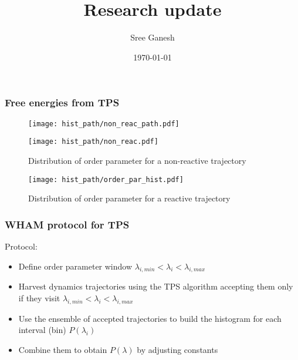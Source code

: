 \documentclass[a4paper,8pt]{beamer}
\title[Free energy]{Research update}
\date{\today}
\author{Sree Ganesh}
\institute[U of A]{Schwartz Group \\ University of Arizona}
\begin{document}
\maketitle
%
%
%
%
\begin{frame}
\frametitle{Free energies from TPS}
\begin{figure}
\texttt{[image: hist\_path/non\_reac\_path.pdf]}
\end{figure} 
    \begin{figure}[ht]
        \begin{minipage}[b]{0.45\linewidth}
            \centering
            \texttt{[image: hist\_path/non\_reac.pdf]}
            \caption{Distribution of order parameter for a non-reactive trajectory}
            \label{fig:a}
        \end{minipage}
        \hspace{0.5cm}
        \begin{minipage}[b]{0.45\linewidth}
            \centering
            \texttt{[image: hist\_path/order\_par\_hist.pdf]}
            \caption{Distribution of order parameter for a reactive trajectory}
            \label{fig:b}
        \end{minipage}
    \end{figure}
\end{frame}
%
\begin{frame}
\frametitle{WHAM protocol for TPS}
Protocol:
\begin{itemize}
\item Define order parameter window $\lambda_{i,min}<\lambda_i<\lambda_{i,max}$
\item Harvest dynamics trajectories using the TPS algorithm accepting them only if they visit 
 $\lambda_{i,min}<\lambda_i<\lambda_{i,max}$
 \item Use the ensemble of accepted trajectories to build the histogram for each interval (bin) 
 $P(\lambda_i)$
 \item Combine them to obtain $P(\lambda)$ by adjusting constants 
\end{itemize}
\pause
\end{frame}
\end{document}
